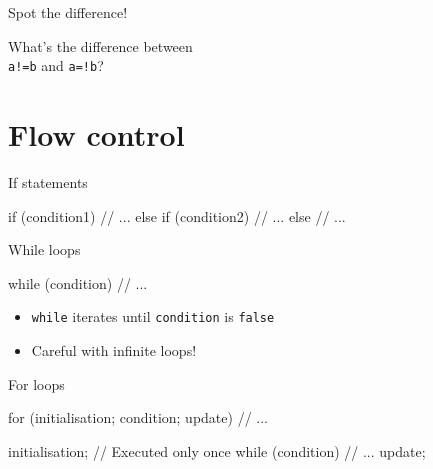 \begin{frame}[fragile]{Spot the difference!}
    \begin{center}
        {\Large%
         What's the difference between \\[1em]
         \texttt{a!=b} and \texttt{a=!b}?}
    \end{center}
\end{frame}

\section{Flow control}

\begin{frame}[fragile]{If statements}
    \begin{cpp}
        if (condition1)
        {
            // ...
        }
        else if (condition2)
        {
            // ...
        }
        else
        {
            // ...
        }
    \end{cpp}
\end{frame}


\begin{frame}[fragile]{While loops}
    \begin{cpp}
        while (condition)
        {
            // ...
        }
    \end{cpp}
    \vspace{-1em}
    \begin{itemize}
        \item \texttt{while} iterates until \texttt{condition}
              is \texttt{false}
        \item Careful with infinite loops!
    \end{itemize}
\end{frame}

\begin{frame}[fragile]{For loops}
    \vspace{0.5em}
    \begin{cpp}
        for (initialisation; condition; update)
        {
            // ...
        }
    \end{cpp}
    \vspace{-2.5em}
    \begin{cpp}
        initialisation; // Executed only once
        while (condition)
        {
            // ...
            update;
        }
    \end{cpp}
\end{frame}

